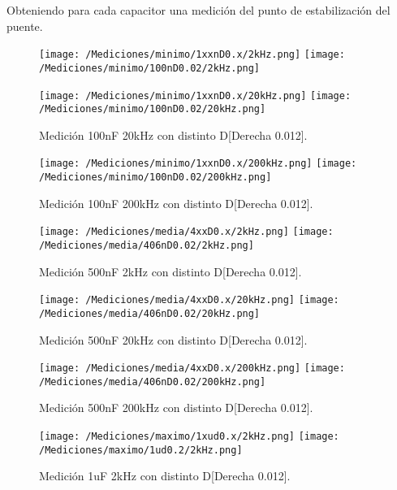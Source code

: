 Obteniendo para cada capacitor una medición del punto de estabilización del puente.
\begin{figure}[H]
	\centering
	\texttt{[image: /Mediciones/minimo/1xxnD0.x/2kHz.png]}
	\texttt{[image: /Mediciones/minimo/100nD0.02/2kHz.png]}
	\label{fig:fcon}
\end{figure}
\begin{figure}[H]
	\centering
	\texttt{[image: /Mediciones/minimo/1xxnD0.x/20kHz.png]}
	\texttt{[image: /Mediciones/minimo/100nD0.02/20kHz.png]}
\caption{Medición 100nF 20kHz con distinto D[Derecha 0.012].}
	\label{fig:fcon}
\end{figure}
\begin{figure}[H]
	\centering
	\texttt{[image: /Mediciones/minimo/1xxnD0.x/200kHz.png]}
	\texttt{[image: /Mediciones/minimo/100nD0.02/200kHz.png]}
\caption{Medición 100nF 200kHz con distinto D[Derecha 0.012].}
	\label{fig:fcon}
\end{figure}
\begin{figure}[H]
	\centering
	\texttt{[image: /Mediciones/media/4xxD0.x/2kHz.png]}
	\texttt{[image: /Mediciones/media/406nD0.02/2kHz.png]}
\caption{Medición 500nF 2kHz con distinto D[Derecha 0.012].}
	\label{fig:fcon}
\end{figure}
\begin{figure}[H]
	\centering
	\texttt{[image: /Mediciones/media/4xxD0.x/20kHz.png]}
	\texttt{[image: /Mediciones/media/406nD0.02/20kHz.png]}
\caption{Medición 500nF 20kHz con distinto D[Derecha 0.012].}
	\label{fig:fcon}
\end{figure}
\begin{figure}[H]
	\centering
	\texttt{[image: /Mediciones/media/4xxD0.x/200kHz.png]}
	\texttt{[image: /Mediciones/media/406nD0.02/200kHz.png]}
\caption{Medición 500nF 200kHz con distinto D[Derecha 0.012].}
	\label{fig:fcon}
\end{figure}
\begin{figure}[H]
	\centering
	\texttt{[image: /Mediciones/maximo/1xud0.x/2kHz.png]}
	\texttt{[image: /Mediciones/maximo/1ud0.2/2kHz.png]}
\caption{Medición 1uF 2kHz con distinto D[Derecha 0.012].}
	\label{fig:fcon}
\end{figure}
